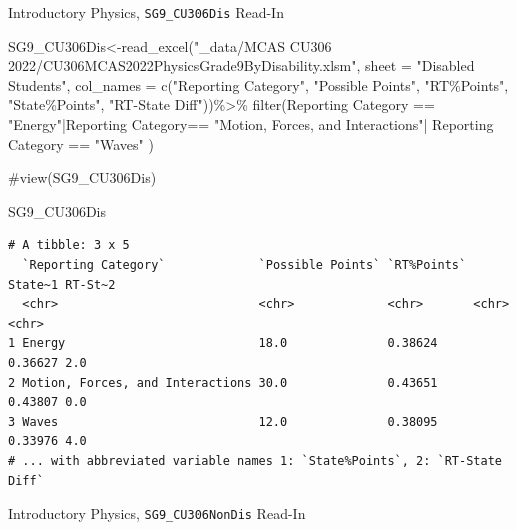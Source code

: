 \documentclass[
  letterpaper,
  DIV=11,
  numbers=noendperiod]{scrartcl}
\newenvironment{Shaded}{\begin{snugshade}}{\end{snugshade}}
\newcommand{\AttributeTok}[1]{\textcolor[rgb]{0.40,0.45,0.13}{#1}}
\newcommand{\CommentTok}[1]{\textcolor[rgb]{0.37,0.37,0.37}{#1}}
\newcommand{\FunctionTok}[1]{\textcolor[rgb]{0.28,0.35,0.67}{#1}}
\newcommand{\NormalTok}[1]{\textcolor[rgb]{0.00,0.23,0.31}{#1}}
\newcommand{\OtherTok}[1]{\textcolor[rgb]{0.00,0.23,0.31}{#1}}
\newcommand{\SpecialCharTok}[1]{\textcolor[rgb]{0.37,0.37,0.37}{#1}}
\newcommand{\StringTok}[1]{\textcolor[rgb]{0.13,0.47,0.30}{#1}}
\begin{document}
Introductory Physics, \texttt{SG9\_CU306Dis} Read-In

\begin{Shaded}
\begin{Highlighting}[]
\NormalTok{SG9\_CU306Dis}\OtherTok{\textless{}{-}}\FunctionTok{read\_excel}\NormalTok{(}\StringTok{"\_data/MCAS CU306 2022/CU306MCAS2022PhysicsGrade9ByDisability.xlsm"}\NormalTok{, }
  \AttributeTok{sheet =} \StringTok{"Disabled Students"}\NormalTok{, }
   \AttributeTok{col\_names =} \FunctionTok{c}\NormalTok{(}\StringTok{"Reporting Category"}\NormalTok{, }\StringTok{"Possible Points"}\NormalTok{, }\StringTok{"RT\%Points"}\NormalTok{,}
                \StringTok{"State\%Points"}\NormalTok{, }\StringTok{"RT{-}State Diff"}\NormalTok{))}\SpecialCharTok{\%\textgreater{}\%}
  \FunctionTok{filter}\NormalTok{(}\StringTok{\textasciigrave{}}\AttributeTok{Reporting Category}\StringTok{\textasciigrave{}} \SpecialCharTok{==} \StringTok{"Energy"}\SpecialCharTok{|}\StringTok{\textasciigrave{}}\AttributeTok{Reporting Category}\StringTok{\textasciigrave{}}\SpecialCharTok{==} \StringTok{"Motion, Forces, and Interactions"}\SpecialCharTok{|} \StringTok{\textasciigrave{}}\AttributeTok{Reporting Category}\StringTok{\textasciigrave{}} \SpecialCharTok{==} \StringTok{"Waves"}\NormalTok{ )}

\CommentTok{\#view(SG9\_CU306Dis)}


\NormalTok{SG9\_CU306Dis}
\end{Highlighting}
\end{Shaded}

\begin{verbatim}
# A tibble: 3 x 5
  `Reporting Category`             `Possible Points` `RT%Points` State~1 RT-St~2
  <chr>                            <chr>             <chr>       <chr>   <chr>  
1 Energy                           18.0              0.38624     0.36627 2.0    
2 Motion, Forces, and Interactions 30.0              0.43651     0.43807 0.0    
3 Waves                            12.0              0.38095     0.33976 4.0    
# ... with abbreviated variable names 1: `State%Points`, 2: `RT-State Diff`
\end{verbatim}

Introductory Physics, \texttt{SG9\_CU306NonDis} Read-In
\end{document}
